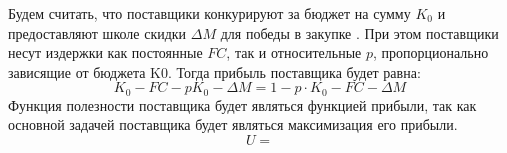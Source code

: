 Будем считать, что поставщики конкурируют за бюджет на сумму $K_0$ и 
предоставляют школе скидки $\Delta M$ для победы в закупке \cite{shubik1971game}.
 При этом поставщики несут издержки как постоянные $FC$, так и относительные $p$, пропорционально зависящие от бюджета K0. Тогда прибыль поставщика будет равна:
\begin{equation}
    K_0- FC- pK_0- \Delta M =1-p \cdot K_0 -FC- \Delta M   
\end{equation}
Функция полезности поставщика будет являться функцией прибыли, так как основной задачей поставщика будет являться максимизация его прибыли.
\begin{equation}
    U = 
\end{equation}




